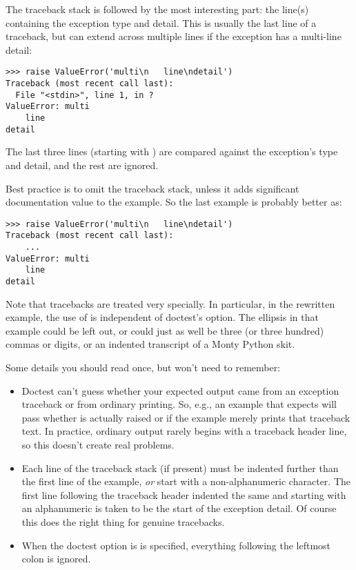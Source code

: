 The traceback stack is followed by the most interesting part:  the
line(s) containing the exception type and detail.  This is usually the
last line of a traceback, but can extend across multiple lines if the
exception has a multi-line detail:

\begin{verbatim}
>>> raise ValueError('multi\n   line\ndetail')
Traceback (most recent call last):
  File "<stdin>", line 1, in ?
ValueError: multi
    line
detail
\end{verbatim}

The last three lines (starting with ) are
compared against the exception's type and detail, and the rest are
ignored.

Best practice is to omit the traceback stack, unless it adds
significant documentation value to the example.  So the last example
is probably better as:

\begin{verbatim}
>>> raise ValueError('multi\n   line\ndetail')
Traceback (most recent call last):
    ...
ValueError: multi
    line
detail
\end{verbatim}

Note that tracebacks are treated very specially.  In particular, in the
rewritten example, the use of  is independent of doctest's
 option.  The ellipsis in that example could be left
out, or could just as well be three (or three hundred) commas or digits,
or an indented transcript of a Monty Python skit.

Some details you should read once, but won't need to remember:

\begin{itemize}

\item Doctest can't guess whether your expected output came from an
  exception traceback or from ordinary printing.  So, e.g., an example
  that expects  will pass whether
   is actually raised or if the example merely
  prints that traceback text.  In practice, ordinary output rarely begins
  with a traceback header line, so this doesn't create real problems.

\item Each line of the traceback stack (if present) must be indented
  further than the first line of the example, \emph{or} start with a
  non-alphanumeric character.  The first line following the traceback
  header indented the same and starting with an alphanumeric is taken
  to be the start of the exception detail.  Of course this does the
  right thing for genuine tracebacks.

\item When the  doctest option is
  is specified, everything following the leftmost colon is ignored.

\end{itemize}

